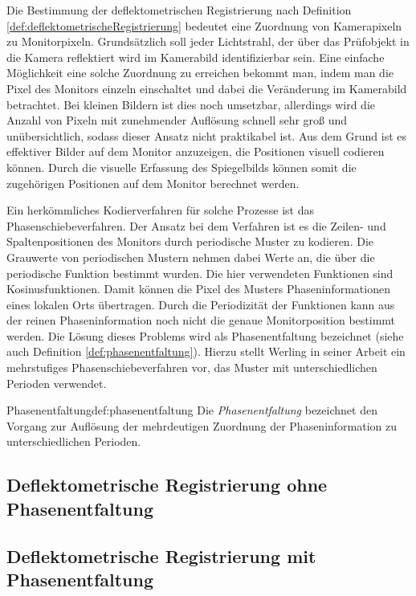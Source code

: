 Die Bestimmung der deflektometrischen Registrierung nach Definition \ref{def:deflektometrischeRegistrierung} bedeutet eine Zuordnung von Kamerapixeln zu Monitorpixeln.
Grundsätzlich soll jeder Lichtstrahl, der über das Prüfobjekt in die Kamera reflektiert wird im Kamerabild identifizierbar sein.
Eine einfache Möglichkeit eine solche Zuordnung zu erreichen bekommt man, indem man die Pixel des Monitors einzeln einschaltet und dabei die Veränderung im Kamerabild betrachtet.
Bei kleinen Bildern ist dies noch umsetzbar, allerdings wird die Anzahl von Pixeln mit zunehmender Auflösung schnell sehr groß und unübersichtlich, sodass dieser Ansatz nicht praktikabel ist.
Aus dem Grund ist es effektiver Bilder auf dem Monitor anzuzeigen, die Positionen visuell codieren können.
Durch die visuelle Erfassung des Spiegelbilds können somit die zugehörigen Positionen auf dem Monitor berechnet werden.

\p
Ein herkömmliches Kodierverfahren für solche Prozesse ist das Phasenschiebeverfahren.
Der Ansatz bei dem Verfahren ist es die Zeilen- und Spaltenpositionen des Monitors durch periodische Muster zu kodieren.
Die Grauwerte von periodischen Mustern nehmen dabei Werte an, die über die periodische Funktion bestimmt wurden.
Die hier verwendeten Funktionen sind Kosinusfunktionen.
Damit können die Pixel des Musters Phaseninformationen eines lokalen Orts übertragen.
Durch die Periodizität der Funktionen kann aus der reinen Phaseninformation noch nicht die genaue Monitorposition bestimmt werden.
Die Lösung dieses Problems wird als Phasenentfaltung bezeichnet (siehe auch Definition \ref{def:phasenentfaltung}).
Hierzu stellt Werling in seiner Arbeit \cite{kit_werling} ein mehrstufiges Phasenschiebeverfahren vor, das Muster mit unterschiedlichen Perioden verwendet.

\begin{Definition}{Phasenentfaltung}{def:phasenentfaltung}
	Die \textit{Phasenentfaltung} bezeichnet den Vorgang zur Auflösung der mehrdeutigen Zuordnung der Phaseninformation zu unterschiedlichen Perioden.
\end{Definition}

{
	\FloatBarrier
    \subsection{Deflektometrische Registrierung ohne Phasenentfaltung}
    \label{sub:registrierungOhnePhasenentfaltung}
    
}

{
	\FloatBarrier
    \subsection{Deflektometrische Registrierung mit Phasenentfaltung}
    \label{sub:registrierungMitPhasenentfaltung}
    
}